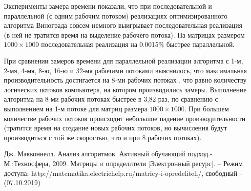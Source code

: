 \documentclass[a4paper,12pt]{article}
\begin{document}
       Эксперименты замера времени показали, что при последовательной и параллельной (с одним рабочим потоком) реализациях оптимизированного алгоритма Винограда совсем немного выигрывает последовательная реализация (в ней не тратится время на выделение рабочего потока). На матрицах размером $1000 \times 1000$ последовательная реализация на 0.0015\% быстрее параллельной.
       
        При сравнении замеров времени для параллельной реализации алгоритма с 1-м, 2-мя, 4-мя, 8-ю, 16-ю и 32-мя рабочими потоками выяснилось, что максимальная производительность достигается на 8-ми рабочих потоках , что равно количеству логических потоков компьютера, на котором производились замеры. Выполнение алгоритма на 8-ми рабочих потоках быстрее в 3,82 раз, по сравнению с выполнением на 1-м потоке для матриц размера $1000 \times 1000$. При большем количестве рабочих потоков происходит небольшое падение производительности (тратится время на создание новых рабочих потоков, но вычисления будут производиться с той же скоростью, что и при 8 рабочих потоках).



\pagebreak
{}
\begin{thebibliography}{4}
Дж. Макконнелл. Анализ алгоритмов. Активный обучающий подход.-
М.:Техносфера, 2009.
Матрицы и определители [Электронный ресурс]. – Режим доступа: http://matematika.electrichelp.ru/matricy-i-opredeliteli/, свободный – (07.10.2019)

\end{thebibliography}
\end{document}
